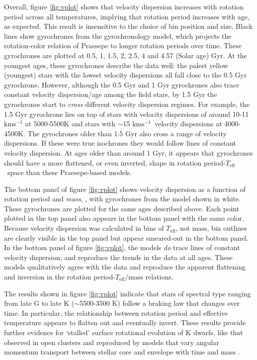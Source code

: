 \documentclass{aastex63}
\newcommand{\teff}{$T_{\mathrm{eff}}$}
\newcommand{\kms}{kms$^{-1}$}
\newcommand{\racomment}[1]{{\color{blue}#1}}
\begin{document}
Overall, figure \ref{fig:vplot} shows that velocity dispersion increases with
rotation period across all temperatures, implying that rotation period
increases with age, as expected.
This result is insensitive to the choice of bin position and size.
Black lines show gyrochrones from the \citet{angus2019} gyrochronology model,
which projects the rotation-color relation of Praesepe to longer rotation
periods over time.
These gyrochrones are plotted at 0.5, 1, 1.5, 2, 2.5, 4 and 4.57 (Solar age)
Gyr.
At the youngest ages, these gyrochrones describe the data well: the palest
yellow (youngest) stars with the lowest velocity dispersions all fall close to
the 0.5 Gyr gyrochrone.
However, although the 0.5 Gyr and 1 Gyr gyrochrones also trace constant
velocity dispersion/age among the field stars, by 1.5 Gyr the gyrochrones
start to {\it cross} different velocity dispersion regimes.
For example, the 1.5 Gyr gyrochrone lies on top of stars with velocity
dispersions of around 10-11 kms$^{-1}$ at 5000-5500K and stars with $\sim$15
\kms\ velocity dispersions at 4000-4500K.
The gyrochrones older than 1.5 Gyr also cross a range of velocity dispersions.
If these were true isochrones they would follow lines of constant velocity
dispersion.
At ages older than around 1 Gyr, it appears that gyrochrones should have a
more flattened, or even inverted, shape in rotation period-\teff\ space than
these Praesepe-based models.

The bottom panel of figure \ref{fig:vplot} shows velocity dispersion as a
function of rotation period and {\it mass}, \citep[from][]{berger2020}, with
gyrochrones from the \citet{spada2019} model shown in white.
These gyrochrones are \racomment{plotted for the same ages described above.}
Each point plotted in the top panel also appears in the bottom panel with the
same color.
Because velocity dispersion was calculated in bins of \teff, not mass, bin
outlines are clearly visible in the top panel but appear smeared-out in the
bottom panel.
In the bottom panel of figure \ref{fig:vplot}, the \citet{spada2019} models
{\it do} trace lines of constant velocity dispersion, and reproduce the trends
in the data at all ages.
These models qualitatively agree with the data and reproduce the apparent
flattening and inversion in the rotation period-\teff/mass relations.

The results shown in figure \ref{fig:vplot} indicate that stars of spectral
type ranging from late G to late K ($\sim$5500-3500 K) follow a braking law
that changes over time.
In particular, the relationship between rotation period and effective
temperature appears to flatten out and eventually invert.
These results provide further evidence for `stalled' surface rotational
evolution of K dwarfs, like that observed in open clusters \citep{curtis2019}
and reproduced by models that vary angular momentum transport between stellar
core and envelope with time and mass \citep{spada2019}.
\end{document}
